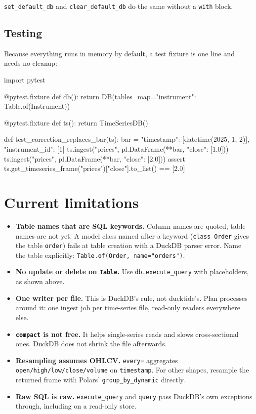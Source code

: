 \documentclass[11pt,a4paper]{article}
\newcommand{\code}[1]{\texttt{#1}}
\begin{document}
\code{set\_default\_db} and \code{clear\_default\_db} do the same without a \code{with} block.

\subsection{Testing}

Because everything runs in memory by default, a test fixture is one line and needs no
cleanup:

\begin{python}
import pytest

@pytest.fixture
def db():
    return DB(tables_map={"instrument": Table.of(Instrument)})

@pytest.fixture
def ts():
    return TimeSeriesDB()

def test_correction_replaces_bar(ts):
    bar = {"timestamp": [datetime(2025, 1, 2)], "instrument_id": [1]}
    ts.ingest("prices", pl.DataFrame({**bar, "close": [1.0]}))
    ts.ingest("prices", pl.DataFrame({**bar, "close": [2.0]}))
    assert ts.get_timeseries_frame("prices")["close"].to_list() == [2.0]
\end{python}

\section{Current limitations}

\begin{itemize}
\item \textbf{Table names that are SQL keywords.} Column names are quoted, table names are
  not yet. A model class named after a keyword (\code{class Order} gives the table
  \code{order}) fails at table creation with a DuckDB parser error. Name the table
  explicitly: \code{Table.of(Order, name="orders")}.
\item \textbf{No update or delete on \code{Table}.} Use \code{db.execute\_query} with
  placeholders, as shown above.
\item \textbf{One writer per file.} This is DuckDB's rule, not ducktide's. Plan processes
  around it: one ingest job per time-series file, read-only readers everywhere else.
\item \textbf{\code{compact} is not free.} It helps single-series reads and slows
  cross-sectional ones. DuckDB does not shrink the file afterwards.
\item \textbf{Resampling assumes OHLCV.} \code{every=} aggregates
  \code{open/high/low/close/volume} on \code{timestamp}. For other shapes, resample the
  returned frame with Polars' \code{group\_by\_dynamic} directly.
\item \textbf{Raw SQL is raw.} \code{execute\_query} and \code{query} pass DuckDB's own
  exceptions through, including on a read-only store.
\end{itemize}
\end{document}
